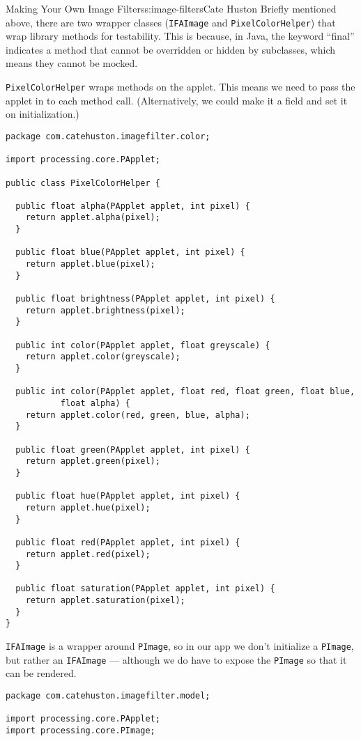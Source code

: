 \begin{aosachapter}{Making Your Own Image Filters}{s:image-filters}{Cate Huston}
Briefly mentioned above, there are two wrapper classes
(\texttt{IFAImage} and \texttt{PixelColorHelper}) that wrap library
methods for testability. This is because, in Java, the keyword ``final''
indicates a method that cannot be overridden or hidden by subclasses,
which means they cannot be mocked.

\texttt{PixelColorHelper} wraps methods on the applet. This means we
need to pass the applet in to each method call. (Alternatively, we could
make it a field and set it on initialization.)

\begin{verbatim}
package com.catehuston.imagefilter.color;

import processing.core.PApplet;

public class PixelColorHelper {

  public float alpha(PApplet applet, int pixel) {
    return applet.alpha(pixel);
  }

  public float blue(PApplet applet, int pixel) {
    return applet.blue(pixel);
  }

  public float brightness(PApplet applet, int pixel) {
    return applet.brightness(pixel);
  }

  public int color(PApplet applet, float greyscale) {
    return applet.color(greyscale);
  }

  public int color(PApplet applet, float red, float green, float blue,
           float alpha) {
    return applet.color(red, green, blue, alpha);
  }

  public float green(PApplet applet, int pixel) {
    return applet.green(pixel);
  }

  public float hue(PApplet applet, int pixel) {
    return applet.hue(pixel);
  }

  public float red(PApplet applet, int pixel) {
    return applet.red(pixel);
  }

  public float saturation(PApplet applet, int pixel) {
    return applet.saturation(pixel);
  }
}
\end{verbatim}

\texttt{IFAImage} is a wrapper around \texttt{PImage}, so in our app we
don't initialize a \texttt{PImage}, but rather an \texttt{IFAImage} ---
although we do have to expose the \texttt{PImage} so that it can be
rendered.

\begin{verbatim}
package com.catehuston.imagefilter.model;

import processing.core.PApplet;
import processing.core.PImage;


\end{verbatim}
\end{aosachapter}
